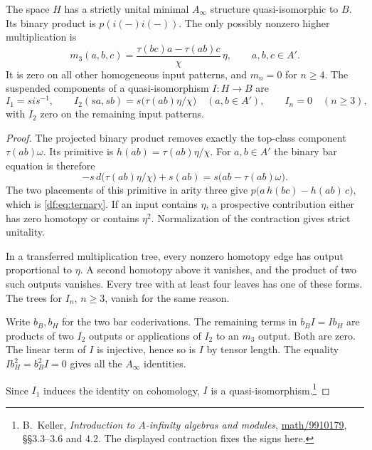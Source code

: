 \begin{theorem}\label{df:thm:minimal}
The space $H$ has a strictly unital minimal $A_\infty$ structure
quasi-isomorphic to $B$. Its binary product is $p(i(-)i(-))$.
The only possibly nonzero higher multiplication is
\begin{equation}\label{df:eq:ternary}
 m_3(a,b,c)=\frac{\tau(bc)a-\tau(ab)c}{\chi}\,\eta,
 \qquad a,b,c\in A'.
\end{equation}
It is zero on all other homogeneous input patterns, and $m_n=0$ for
$n\geq4$. The suspended components of a quasi-isomorphism $I:H\to B$
are
\begin{equation}\label{df:eq:inclusion}
 I_1=si s^{-1},\qquad
 I_2(sa,sb)=s\bigl(\tau(ab)\eta/\chi\bigr)
 \quad(a,b\in A'),\qquad I_n=0\quad(n\geq3),
\end{equation}
with $I_2$ zero on the remaining input patterns.
\end{theorem}

\begin{proof}
The projected binary product removes exactly the top-class component
$\tau(ab)\omega$. Its primitive is $h(ab)=\tau(ab)\eta/\chi$.
For $a,b\in A'$ the binary bar equation is therefore
\[
 -s\,d\bigl(\tau(ab)\eta/\chi\bigr)+s(ab)
       =s\bigl(ab-\tau(ab)\omega\bigr).
\]
The two placements of this primitive in arity three give
$p\bigl(a\,h(bc)-h(ab)\,c\bigr)$, which is
\eqref{df:eq:ternary}. If an input contains $\eta$, a prospective
contribution either has zero homotopy or contains $\eta^2$.
Normalization of the contraction gives strict unitality.

In a transferred multiplication tree, every nonzero homotopy edge
has output proportional to $\eta$. A second homotopy above it vanishes,
and the product of two such outputs vanishes. Every tree with at least
four leaves has one of these forms. The trees for $I_n$, $n\geq3$,
vanish for the same reason.

Write $b_B,b_H$ for the two bar coderivations. The remaining terms in
$b_BI=Ib_H$ are products of two $I_2$ outputs or applications of
$I_2$ to an $m_3$ output. Both are zero.
The linear term of $I$ is injective, hence so is $I$ by tensor length.
The equality $Ib_H^2=b_B^2I=0$ gives all the $A_\infty$ identities.

Since $I_1$ induces the
identity on cohomology, $I$ is a quasi-isomorphism.\footnote{B.~Keller,
\emph{Introduction to $A$-infinity algebras and modules},
\href{https://arxiv.org/abs/math/9910179}{math/9910179},
\S\S3.3--3.6 and 4.2. The displayed contraction fixes the signs here.}
\end{proof}


